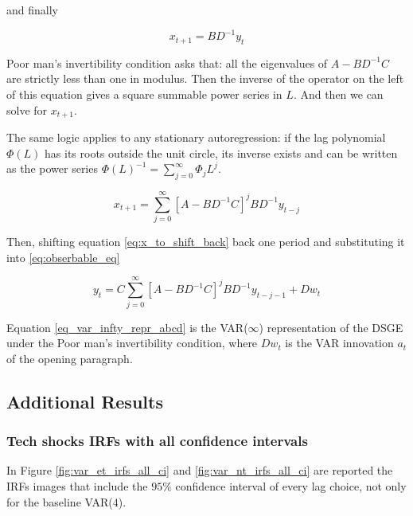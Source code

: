 \documentclass[12pt, a4paper]{article}
\begin{document}
\begin{appendices}
and finally

\begin{equation}
    [\mathbb{I} - (A - BD^{-1}C)L] x_{t+1} =  BD^{-1}y_t
\end{equation}

Poor man's invertibility condition asks that: all the eigenvalues of $A - BD^{-1}C$ are strictly less than
one in modulus. Then the inverse of the operator on the left of this equation gives a square summable power
series in $L$. And then we can solve for $x_{t+1}$.

The same logic applies to any stationary autoregression: if the lag polynomial $\Phi(L)$ has its roots
outside the unit circle, its inverse exists and can be written as the power series
$\Phi(L)^{-1} = \sum_{j=0}^{\infty} \Phi_j L^j$.

\begin{equation}
    x_{t+1} = \sum_{j=0}^{\infty} [A - BD^{-1}C]^j BD^{-1}y_{t-j}
    \label{eq:x_to_shift_back}
\end{equation}

Then, shifting equation \eqref{eq:x_to_shift_back} back one period and substituting it into
\eqref{eq:obserbable_eq}

\begin{equation}
    y_t = C \sum_{j=0}^{\infty} [A - BD^{-1}C]^j BD^{-1}y_{t-j-1} + Dw_t
    \label{eq_var_infty_repr_abcd}
\end{equation}

Equation \eqref{eq_var_infty_repr_abcd} is the VAR($\infty$) representation of the DSGE under the Poor man's
invertibility condition, where $Dw_t$ is the VAR innovation $a_t$ of the opening paragraph.

\clearpage

\subsection{Additional Results}
\label{app:additional_results}

\subsubsection{Tech shocks IRFs with all confidence intervals}
\label{app:irfs_confidence_intervals}

In Figure \ref{fig:var_et_irfs_all_ci} and \ref{fig:var_nt_irfs_all_ci} are reported the IRFs images that include the 
$95\%$ confidence interval of every lag choice, not only for the baseline VAR($4$).


\end{appendices}
\end{document}
